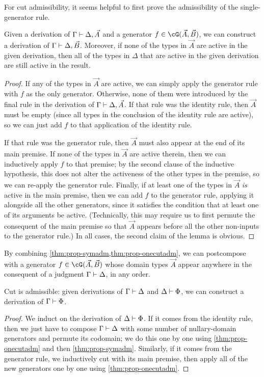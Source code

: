 \begin{props}
For cut admissibility, it seems helpful to first prove the admissibility of the single-generator rule.

\begin{lem}\label{thm:prop-onecutadm}
  Given a derivation of $\Gamma\vdash \Delta,\vec A$ and a generator $f\in \cG(\vec A,\vec B)$, we can construct a derivation of $\Gamma\vdash \Delta,\vec B$.
  Moreover, if none of the types in $\vec A$ are active in the given derivation, then all of the types in $\Delta$ that are active in the given derivation are still active in the result.
\end{lem}
\begin{proof}
  If any of the types in $\vec A$ are active, we can simply apply the generator rule with $f$ as the only generator.
  Otherwise, none of them were introduced by the final rule in the derivation of $\Gamma\vdash \Delta,\vec A$.
  If that rule was the identity rule, then $\vec A$ must be empty (since all types in the conclusion of the identity rule are active), so we can just add $f$ to that application of the identity rule.

  If that rule was the generator rule, then $\vec A$ must also appear at the end of its main premise.
  If none of the types in $\vec A$ are active therein, then we can inductively apply $f$ to that premise; by the second clause of the inductive hypothesis, this does not alter the activeness of the other types in the premise, so we can re-apply the generator rule.
  Finally, if at least one of the types in $\vec A$ \emph{is} active in the main premise, then we can add $f$ to the generator rule, applying it alongside all the other generators, since it satisfies the condition that at least one of its arguments be active.
  (Technically, this may require us to first permute the consequent of the main premise so that $\vec A$ appears before all the other non-inputs to the generator rule.)
  In all cases, the second claim of the lemma is obvious.
\end{proof}

By combining \cref{thm:prop-symadm,thm:prop-onecutadm}, we can postcompose with a generator $f\in \cG(\vec A,\vec B)$ whose domain types $\vec A$ appear anywhere in the consequent of a judgment $\Gamma\vdash\Delta$, in any order.

\begin{thm}\label{thm:prop-cutadm}
  Cut is admissible: given derivations of $\Gamma\vdash \Delta$ and $\Delta \vdash \Phi$, we can construct a derivation of $\Gamma\vdash \Phi$.
\end{thm}
\begin{proof}
  We induct on the derivation of $\Delta \vdash \Phi$.
  If it comes from the identity rule, then we just have to compose $\Gamma\vdash \Delta$ with some number of nullary-domain generators and permute its codomain; we do this one by one using \cref{thm:prop-onecutadm} and then \cref{thm:prop-symadm}.
  Similarly, if it comes from the generator rule, we inductively cut with its main premise, then apply all of the new generators one by one using \cref{thm:prop-onecutadm}.
\end{proof}


\end{props}
